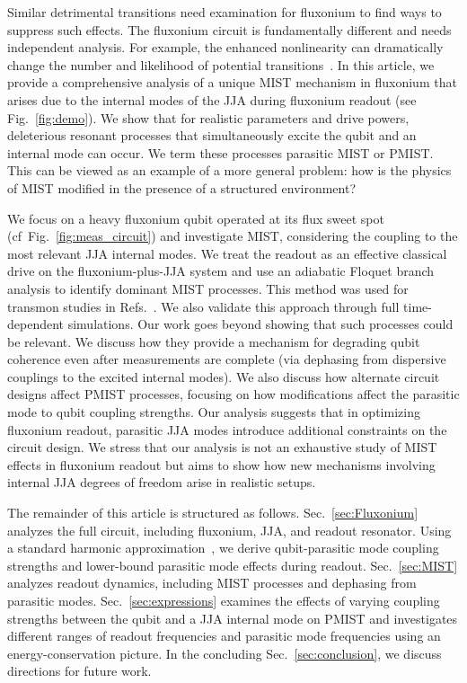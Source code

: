 \documentclass[%
reprint,
superscriptaddress,
 amsmath,amssymb,
 aps,
 prx,
longbibliography,
floatfix,
]{revtex4-2}
\begin{document}
Similar detrimental transitions need examination for fluxonium to find ways to suppress such effects. The fluxonium circuit is fundamentally different and needs independent analysis. For example, the enhanced nonlinearity can dramatically change the number and likelihood of potential transitions~\cite{nesterov2024measurement,xiao2023diagrammatic}. In this article, we provide a comprehensive analysis of a unique MIST mechanism in fluxonium that arises due to the internal modes of the JJA during fluxonium readout (see Fig.~\ref{fig:demo}). We show that for realistic parameters and drive powers, deleterious resonant processes that simultaneously excite the qubit and an internal mode can occur. We term these processes parasitic MIST or PMIST. This can be viewed as an example of a more general problem: how is the physics of MIST modified in the presence of a structured environment?

We focus on a heavy fluxonium qubit operated at its flux sweet spot (cf~Fig.~\ref{fig:meas_circuit}) and investigate MIST, considering the coupling to the most relevant JJA internal modes. We treat the readout as an effective classical drive on the fluxonium-plus-JJA system and use an adiabatic Floquet branch analysis to identify dominant MIST processes. This method was used for transmon studies in Refs.~\cite{cohen2023reminiscence,dumas2024unified}. We also validate this approach through full time-dependent simulations.  
Our work goes beyond showing that such processes could be relevant. We discuss how they provide a mechanism for degrading qubit coherence even after measurements are complete (via dephasing from dispersive couplings to the excited internal modes). We also discuss how alternate circuit designs affect PMIST processes, focusing on how modifications affect the parasitic mode to qubit coupling strengths. Our analysis suggests that in optimizing fluxonium readout, parasitic JJA modes introduce additional constraints on the circuit design. We stress that our analysis is not an exhaustive study of MIST effects in fluxonium readout but aims to show how new mechanisms involving internal JJA degrees of freedom arise in realistic setups.

The remainder of this article is structured as follows. Sec.~\ref{sec:Fluxonium} analyzes the full circuit, including fluxonium, JJA, and readout resonator. Using a standard harmonic approximation~\cite{viola2015collective}, we derive qubit-parasitic mode coupling strengths and lower-bound parasitic mode effects during readout. Sec.~\ref{sec:MIST} analyzes readout dynamics, including MIST processes and dephasing from parasitic modes. Sec.~\ref{sec:expressions} examines the effects of varying coupling strengths between the qubit and a JJA internal mode on PMIST and investigates different ranges of readout frequencies and parasitic mode frequencies using an energy-conservation picture. In the concluding Sec.~\ref{sec:conclusion}, we discuss directions for future work.
\end{document}
